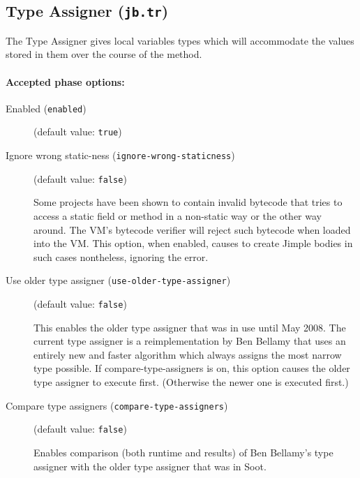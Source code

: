 \documentclass{article}
\begin{document}
\subsection{Type Assigner ({\tt jb.tr})}

The Type Assigner gives local variables types which will
accommodate the values stored in them over the course of the
method.


\paragraph{Accepted phase options:} 

\begin{description}

\item[Enabled ({\tt enabled})]
(default value: {\tt true})






\item[Ignore wrong static-ness ({\tt ignore-wrong-staticness})]
(default value: {\tt false})




Some projects have been shown to contain invalid bytecode that tries to access
a static field or method in a non-static way or the other way around. The VM's bytecode
verifier will reject such bytecode when loaded into the VM. This option, when enabled,
causes to create Jimple bodies in such cases nontheless, ignoring the error.



\item[Use older type assigner ({\tt use-older-type-assigner})]
(default value: {\tt false})




This enables the older type assigner that was in use until May 2008.
The current type assigner is a reimplementation by Ben Bellamy
that uses an entirely new and faster algorithm which always assigns
the most narrow type possible. If compare-type-assigners is on,
this option causes the older type assigner to execute first.
(Otherwise the newer one is executed first.)



\item[Compare type assigners ({\tt compare-type-assigners})]
(default value: {\tt false})




Enables comparison (both runtime and results) of Ben Bellamy's type assigner with the
older type assigner that was in Soot.



\end{description}
\end{document}

